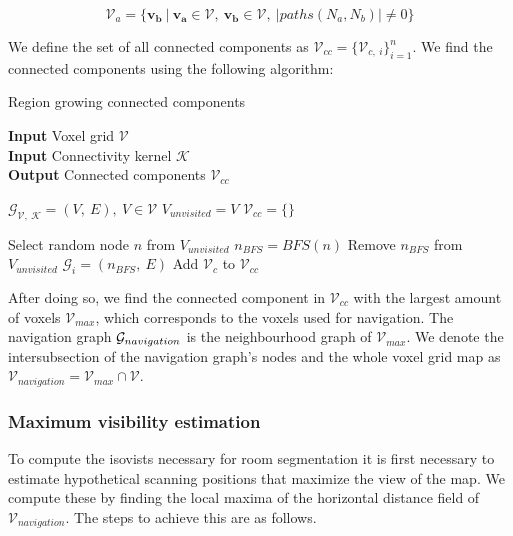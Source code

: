\begin{equation}
    \label{eq:connected_components_03}
\mathcal{V}_a=\{\boldsymbol{v_b}\ |\ \boldsymbol{v_a} \in \mathcal{V},\ \boldsymbol{v_b} \in \mathcal{V},\ |paths(N_a, N_b)| \neq 0\}
\end{equation}

We define the set of all connected components as \(\mathcal{V}_{cc}=\{\mathcal{V}_{c,\ i}\}_{i=1}^n\). We find the connected components using the following algorithm:

\begin{algorithm}
    \caption{Region growing connected components}\label{alg:cap}
    \hspace*{\algorithmicindent} \textbf{Input} Voxel grid \(\mathcal{V}\) \\
    \hspace*{\algorithmicindent} \textbf{Input} Connectivity kernel \(\mathcal{K}\) \\
    \hspace*{\algorithmicindent} \textbf{Output} Connected components \(\mathcal{V}_{cc}\) \\

    \begin{algorithmic}

    \State \(\mathcal{G}_{\mathcal{V},\ \mathcal{K}} = (V,\ E),\ V \in \mathcal{V}\) 
    \State \(V_{unvisited} = V\)
    \State \(\mathcal{V}_{cc} = \{\}\)
    
        \State Select random node \(n\) from \(V_{unvisited}\)
        \State \(n_{BFS} = BFS(n)\) 
        \State Remove \(n_{BFS}\) from \(V_{unvisited}\)
        \State \(\mathcal{G}_i = (n_{BFS},\ E)\)
        \State Add \(\mathcal{V}_{c}\) to \(\mathcal{V}_{cc}\)
    \EndWhile
    \end{algorithmic}
\end{algorithm}

After doing so, we find the connected component in \(\mathcal{V}_{cc}\) with the largest amount of voxels \(\mathcal{V}_{max}\), which corresponds to the voxels used for navigation. The navigation graph \(\mathcal{G}_{navigation}\) is the neighbourhood graph of \(\mathcal{V}_{max}\). We denote the intersubsection of the navigation graph's nodes and the whole voxel grid map as \(\mathcal{V}_{navigation} = \mathcal{V}_{max} \cap \mathcal{V}\).

\subsubsection{Maximum visibility estimation}
To compute the isovists necessary for room segmentation it is first necessary to estimate hypothetical scanning positions that maximize the view of the map. We compute these by finding the local maxima of the horizontal distance field of \(\mathcal{V}_{navigation}\). The steps to achieve this are as follows. 

